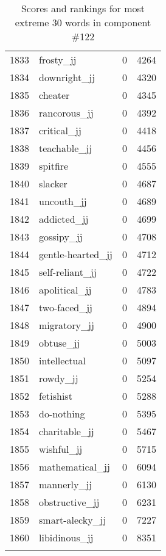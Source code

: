 \begin{longtable}[!htbp]{| rlr@{.}l |}
    1833 & frosty\_jj & 0 & 4264 \\
    1834 & downright\_jj & 0 & 4320 \\
    1835 & cheater & 0 & 4345 \\
    1836 & rancorous\_jj & 0 & 4392 \\
    1837 & critical\_jj & 0 & 4418 \\
    1838 & teachable\_jj & 0 & 4456 \\
    1839 & spitfire & 0 & 4555 \\
    1840 & slacker & 0 & 4687 \\
    1841 & uncouth\_jj & 0 & 4689 \\
    1842 & addicted\_jj & 0 & 4699 \\
    1843 & gossipy\_jj & 0 & 4708 \\
    1844 & gentle-hearted\_jj & 0 & 4712 \\
    1845 & self-reliant\_jj & 0 & 4722 \\
    1846 & apolitical\_jj & 0 & 4783 \\
    1847 & two-faced\_jj & 0 & 4894 \\
    1848 & migratory\_jj & 0 & 4900 \\
    1849 & obtuse\_jj & 0 & 5003 \\
    1850 & intellectual & 0 & 5097 \\
    1851 & rowdy\_jj & 0 & 5254 \\
    1852 & fetishist & 0 & 5288 \\
    1853 & do-nothing & 0 & 5395 \\
    1854 & charitable\_jj & 0 & 5467 \\
    1855 & wishful\_jj & 0 & 5715 \\
    1856 & mathematical\_jj & 0 & 6094 \\
    1857 & mannerly\_jj & 0 & 6130 \\
    1858 & obstructive\_jj & 0 & 6231 \\
    1859 & smart-alecky\_jj & 0 & 7227 \\
    1860 & libidinous\_jj & 0 & 8351 \\
    \hline
    \caption{Scores and rankings for most extreme 30 words in component \#122} \\
\end{longtable}
